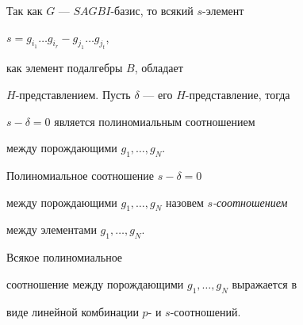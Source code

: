 Так как $G$ --- $SAGBI$-базис, то всякий $s$-элемент


$s=g_{i_{1}}\dotsc g_{i_{r}}-g_{j_{1}}\dotsc g_{j_{t}}$,


как элемент подалгебры $B$, обладает


$H$-представлением. Пусть $\delta$ --- его $H$-представление, тогда 


$s-\delta=0$  является полиномиальным соотношением


между порождающими $g_{1},\dotsc ,g_{N}$.





\begin{defn}


Полиномиальное соотношение  $s-\delta=0$


между порождающими $g_{1},\dotsc,g_{N}$  назовем {\it $s$-соотношением}


между элементами $g_{1},\dotsc,g_{N}$.


\end{defn}





\begin{thm}


Всякое полиномиальное


соотношение между порождающими $g_{1},\dotsc, g_{N}$ выражается в


виде линейной комбинации $p$- и  $s$-соотношений.


\end{thm}





